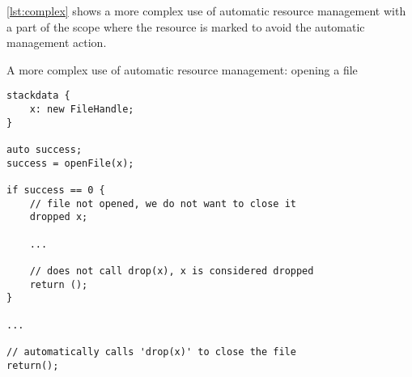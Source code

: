 \cref{lst:complex} shows a more complex use of automatic resource management with a part of the scope where the resource is marked to avoid the automatic management action.


\begin{codex}
    \caption{A more complex use of automatic resource management: opening a file}
    \label{lst:complex}
    \begin{lstlisting}
stackdata {
    x: new FileHandle;
}

auto success;
success = openFile(x);

if success == 0 {
    // file not opened, we do not want to close it
    dropped x;

    ...

    // does not call drop(x), x is considered dropped
    return ();
}

...

// automatically calls 'drop(x)' to close the file
return();
    \end{lstlisting}
\end{codex}
